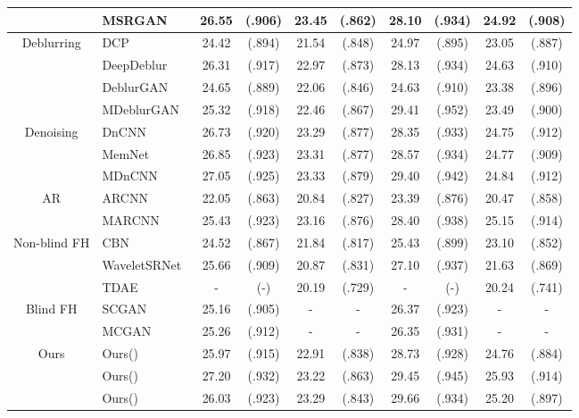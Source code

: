 \documentclass[runningheads]{llncs}
\begin{document}
\begin{table*}[t]
{\begin{center}
\begin{tabular}{ c| l|c c c  c|c c c c}
&MSRGAN& 26.55 & (.906) &  {\color{blue}23.45} & (.862) & 28.10 & (.934) & 24.92 & (.908)\\
				\hline
				\multirow{4}{*}{Deblurring}&DCP~\cite{pan2016blind}& 24.42 & (.894) & 21.54 &(.848) & 24.97 & (.895) & 23.05 &(.887)\\
				&DeepDeblur~\cite{Nah2017CVPR}& 26.31 & (.917) & 22.97 &(.873) & 28.13 & (.934) & 24.63 &(.910)\\
				&DeblurGAN~\cite{DeblurGAN}& 24.65 & (.889) & 22.06 &(.846) & 24.63 & (.910) & 23.38 &(.896)\\
				&MDeblurGAN& 25.32 & (.918) & 22.46 &(.867) & {\color{blue}29.41} & ({\color{blue}.952}) & 23.49 &(.900)\\
				\hline
				\multirow{3}{*}{Denoising}&DnCNN~\cite{zhang2017beyond}& 26.73 & (.920) & 23.29 &(.877) & 28.35 & (.933) & 24.75 &(.912)\\
				&MemNet~\cite{MemNet}& 26.85 & (.923) & 23.31 &(.877) & 28.57 & (.934) & 24.77 &(.909)\\
                &MDnCNN& {\color{blue}27.05} & ({\color{blue}.925}) & 23.33 &({\color{blue}.879}) & 29.40 & (.942) & 24.84 &(.912)\\
				\hline
				\multirow{2}{*}{AR}&ARCNN~\cite{Dong2015ICCV}& 22.05 & (.863) & 20.84 &(.827) & 23.39 & (.876) & 20.47 &(.858)\\
				&MARCNN& 25.43 & (.923) & 23.16 &(.876) & 28.40 & (.938) & {\color{blue}25.15} &({\color{blue}.914})\\
				\hline
				\multirow{3}{*}{Non-blind FH}&CBN~\cite{zhu2016deep}& 24.52 & (.867)& 21.84 & (.817)& 25.43 & (.899) & 23.10 & (.852)\\
				&WaveletSRNet~\cite{huang2017wavelet}& 25.66 & (.909) & 20.87 &(.831) & 27.10 & (.937) & 21.63 &(.869)\\
				&TDAE~\cite{yu2017hallucinating}& - & (-) & 20.19 &(.729) & - & (-) & 20.24 &(.741)\\
				\hline
				\multirow{2}{*}{Blind FH}&SCGAN~\cite{xu2017learning}& 25.16 & (.905) & - & -& 26.37 & (.923) & - & -\\
				&MCGAN~\cite{xu2017learning}& 25.26 & (.912) & - & -& 26.35 & (.931) & - & - \\
				\hline
				\multirow{7}{*}{Ours}&Ours()& 25.97 & (.915) & 22.91 & (.838) & 28.73 & (.928) & 24.76 & (.884)\\
				&Ours()& 27.20 & (.932) & 23.22 & (.863) & 29.45 & (.945) & 25.93 & (.914)\\
				&Ours() & 26.03 & (.923) & 23.29 & (.843) & 29.66 & (.934) & 25.20 & (.897)\\

\end{tabular}
\end{center}}
\end{table*}
\end{document}
